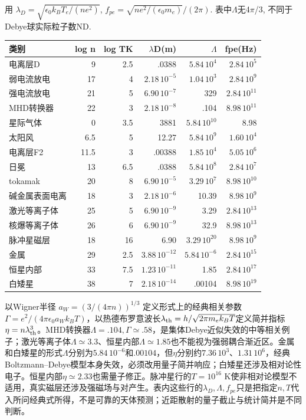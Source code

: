 \begin{solution}
用 $\lambda_D=\sqrt{\epsilon_0k_BT_e/(ne^2)}$, $f_{pe}=\sqrt{ne^2/(\epsilon_0m_e)}/(2\pi)$. 表中\ensuremath{\Lambda}无4\ensuremath{\pi}/3, 不同于Debye球实际粒子数ND.
\begin{center}\small\begin{tabular}{lrrrrr}
\toprule 类别&log n&log TK&\ensuremath{\lambda}D(m)&\ensuremath{\Lambda}&fpe(Hz)\\\midrule
电离层D&9&2.5&.0388&$5.84\,10^4$&$2.84\,10^5$\\
弱电流放电&17&4&$2.18\,10^{-5}$&$1.04\,10^3$&$2.84\,10^9$\\
强电流放电&21&5&$6.90\,10^{-7}$&329&$2.84\,10^{11}$\\
MHD转换器&22&3&$2.18\,10^{-8}$&.104&$8.98\,10^{11}$\\
星际气体&0&3.5&3881&$5.84\,10^{10}$&8.98\\
太阳风&6.5&5&12.27&$5.84\,10^9$&$1.60\,10^4$\\
电离层F2&11.5&3&.00388&$1.85\,10^4$&$5.05\,10^6$\\
日冕&13&6.5&.0388&$5.84\,10^8$&$2.84\,10^7$\\
tokamak&20&8&$6.90\,10^{-5}$&$3.29\,10^7$&$8.98\,10^{10}$\\
碱金属表面电离&18&3&$2.18\,10^{-6}$&10.39&$8.98\,10^9$\\
激光等离子体&25&5&$6.90\,10^{-9}$&3.29&$2.84\,10^{13}$\\
核爆等离子体&26&6&$6.90\,10^{-9}$&32.9&$8.98\,10^{13}$\\
脉冲星磁层&18&16&6.90&$3.29\,10^{20}$&$8.98\,10^9$\\
金属&29&2.5&$3.88\,10^{-12}$&$5.84\,10^{-6}$&$2.84\,10^{15}$\\
恒星内部&33&7.5&$1.23\,10^{-11}$&1.85&$2.84\,10^{17}$\\
白矮星&38&7&$2.18\,10^{-14}$&.00104&$8.98\,10^{19}$\\\bottomrule
\end{tabular}\end{center}
以Wigner半径 $a_W=(3/(4\pi n))^{1/3}$ 定义形式上的经典相关参数$\Gamma=e^2/(4\pi\epsilon_0a_Wk_BT)$，以热德布罗意波长$\lambda_{\rm th}=h/\sqrt{2\pi m_ek_BT}$定义简并指标$\eta=n\lambda_{\rm th}^3$。MHD转换器$\Lambda=.104,\Gamma\simeq.58$，是集体Debye近似失效的中等相关例子；激光等离子体$\Lambda\simeq3.3$、恒星内部$\Lambda\simeq1.85$也不能视为强弱耦合渐近区。金属和白矮星的形式$\Lambda$分别为$5.84\,10^{-6}$和$.00104$，但$\eta$分别约$7.36\,10^3$、$1.31\,10^6$，经典Boltzmann--Debye模型本身失效，必须改用量子简并响应；白矮星还涉及相对论性电子。恒星内部$\eta\simeq2.33$也需量子修正。脉冲星行的$T=10^{16}$ K使非相对论模型不适用，真实磁层还涉及强磁场与对产生。表内这些行的$\lambda_D,\Lambda,f_{pe}$只是把指定$n,T$代入所问经典式所得，不是可靠的天体预测；近距散射的量子截止与统计简并是不同判断。
\end{solution}
